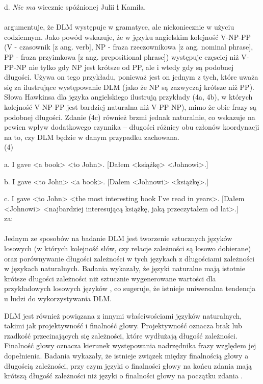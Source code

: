 \documentclass[licencjacka]{pracamgr_Kogni}
\begin{document}
d. \textit{Nie ma} wiecznie spóźnionej Julii \textbf{i} Kamila.
\\
\\
\citet{Hawkins1994} argumentuje, że DLM występuje w gramatyce, ale niekoniecznie w użyciu codziennym. Jako powód wskazuje, że w języku angielskim kolejność V-NP-PP (V - czasownik [z ang. verb], NP - fraza rzeczownikowa [z ang. nominal phrase], PP - fraza przyimkowa [z ang. prepositional phrase]) występuje częsciej niż V-PP-NP nie tylko gdy NP jest krótsze od PP, ale i wtedy gdy są podobnej długości. Używa on tego przykładu, ponieważ jest on jednym z tych, które uważa się za ilustrujące występowanie DLM (jako że NP są zazwyczaj krótsze niż PP). Słowa Hawkinsa dla języka angielskiego ilustrują przykłady (4a, 4b), w których kolejność V-NP-PP jest bardziej naturalna niż V-PP-NP), mimo że obie frazy są podobnej długości. Zdanie (4c) również brzmi jednak naturalnie, co wskazuje na pewien wpływ dodatkowego czynnika --  długości różnicy obu członów koordynacji na to, czy DLM będzie w danym przypadku zachowana.
\\

(4)

a. I gave <a book> <to John>. [Dałem <książkę> <Johnowi>.]

b. I gave <to John> <a book>. [Dałem <Johnowi> <książkę>.]

c. I gave <to John> <the most interesting book I've read in years>. [Dałem <Johnowi> <najbardziej interesującą książkę, jaką przeczytałem od lat>.]\\
za: \citet{AnonimoweNieopublikowane}
\\
\\
Jednym ze sposobów na badanie DLM jest tworzenie sztucznych języków losowych (w których kolejność słów, czy relacje zależności są losowo dobierane) oraz porównywanie długości zależności w tych językach z długościami zależności w językach naturalnych. Badania wykazały, że języki naturalne mają istotnie krótsze długości zależności niż sztucznie wygenerowane wartości dla przykładowych losowych języków \citep{FutrellEtAl2015}, co sugeruje, że istnieje uniwersalna tendencja u ludzi do wykorzystywania DLM.

DLM jest również powiązana z innymi właściwościami języków naturalnych, takimi jak projektywność i finalność głowy. Projektywność oznacza brak lub rzadkość przecinających się zależności, które wydłużają długość zależności. Finalność głowy oznacza kierunek występowania nadrzędnika frazy względem jej dopełnienia. Badania wykazały, że istnieje związek między finalnością głowy a długością zależności, przy czym języki o finalności głowy na końcu zdania mają krótszą długość zależności niż języki o finalności głowy na początku zdania \citep{FutrellEtAl2015}.
\end{document}
